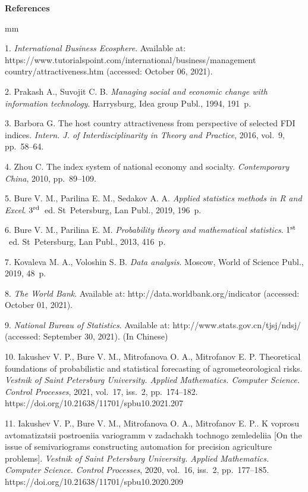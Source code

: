 

{\small



\vskip6mm

\noindent \textbf{References} }

 mm

{\footnotesize



1. {\it International Business Ecosphere}. Available at:\\ https://www.tutorialspoint.com/international/business/management country/attractiveness.htm (ac\-ces\-sed: October 06, 2021).

2. {Prakash A., Suvojit C. B.} {\it Managing social and economic change with information technology}. Harrysburg, Idea group Publ., 1994, 191~p.

3. {Barbora G.} The host country attractiveness from perspective of selected FDI indices. {\it Intern. J. of Interdisciplinarity in Theory and Practice}, 2016, vol.~9, pp.~58--64.

4.  {Zhou C.} The index system of national economy and socialty. {\it Contemporary China}, 2010, pp.~89--109.

5. {Bure V. M., Parilina E. M., Sedakov A. A.} {\it Applied statistics methods in R and Excel}. $3^{\rm rd}$~ed. St~Pe\-ters\-burg, Lan Publ., 2019, 196~p.

6. {Bure V. M., Parilina E. M.} {\it Probability theory and mathematical statistics}. $1^{\rm st}$~ed. St~Petersburg, Lan Publ., 2013, 416~p.

7. {Kovaleva M. A., Voloshin S. B.}
{\it Data analysis}. Moscow, World of Science Publ., 2019, 48~p.

8. {\it The World Bank}. Available at: http://data.worldbank.org/indicator (accessed: October 01, 2021).

9. {\it National Bureau of Statistics}. Available at: http://www.stats.gov.cn/tjsj/ndsj/ (accessed: September 30, 2021).  (In Chinese)

10. {Iakushev V. P., Bure V. M., Mitrofanova O. A., Mitrofanov E. P.}
 Theoretical foundations of probabilistic and statistical forecasting of agrometeorological risks. {\it Vestnik of Saint Petersburg University. Applied Mathematics. Computer Science. Control Processes}, 2021, vol.~17, iss.~2, pp.~174--182. https://doi.org/10.21638/11701/spbu10.2021.207

11. {Iakushev V. P., Bure V. M., Mitrofanova O. A., Mitrofanov E. P.}.
K voprosu avtomatizatsii po\-stroe\-niia variogramm v zadachakh tochnogo zemledeliia [On the issue of semivariograms con\-struc\-ting auto\-mation for precision agriculture problems]. {\it Vestnik of Saint Petersburg University. Ap\-plied Ma\-the\-ma\-tics. Com\-pu\-ter Scien\-ce. Control Processes}, 2020, vol.~16, iss.~2, pp.~177--185.
 https://doi.org/10.21638/11701/spbu10.2020.209



}
